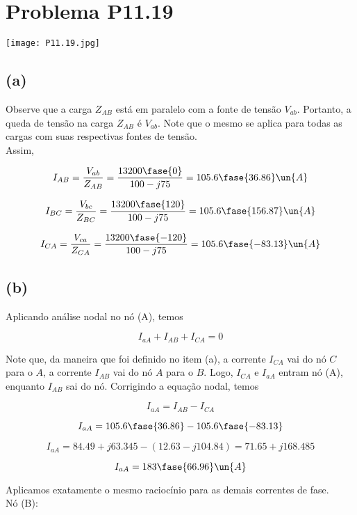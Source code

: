 
\section*{Problema P11.19}

\renewcommand*\thesection{11.19}

\begin{center}
    \texttt{[image: P11.19.jpg]}
\end{center}

\subsection*{(a)} 

Observe que a carga $Z_{AB}$ está em paralelo com a fonte de tensão $V_{ab}$. Portanto, a queda de tensão na carga $Z_{AB}$
é $V_{ab}$. Note que o mesmo se aplica para todas as cargas com suas respectivas fontes de tensão. 
\\ Assim,  

\[ I_{AB} = \frac{V_{ab}}{Z_{AB}} = \frac{13200\fase{0}}{100 - j75} = 105.6\fase{36.86} \un{A} \]

\[ I_{BC} = \frac{V_{bc}}{Z_{BC}} = \frac{13200\fase{120}}{100 - j75} = 105.6\fase{156.87} \un{A} \]

\[ I_{CA} = \frac{V_{ca}}{Z_{CA}} = \frac{13200\fase{-120}}{100 - j75} = 105.6\fase{-83.13} \un{A} \]

\subsection*{(b)} 

Aplicando análise nodal no nó (A), temos  

\[ I_{aA} + I_{AB} + I_{CA} = 0 \]

Note que, da maneira que foi definido no item (a), a corrente $I_{CA}$ vai do nó $C$ para o $A$, a corrente
$I_{AB}$ vai do nó $A$ para o $B$. Logo, $I_{CA}$ e $I_{aA}$ entram nó (A), enquanto $I_{AB}$ sai do nó. Corrigindo a equação
nodal, temos  

\[ I_{aA} = I_{AB} - I_{CA} \]

\[ I_{aA} = 105.6\fase{36.86} - 105.6\fase{-83.13} \]

\[ I_{aA} = 84.49 + j63.345 - (12.63 - j104.84) = 71.65 + j168.485 \]

\[ I_{aA} = 183\fase{66.96} \un{A} \]

Aplicamos exatamente o mesmo raciocínio para as demais correntes de fase. \\
Nó (B):

